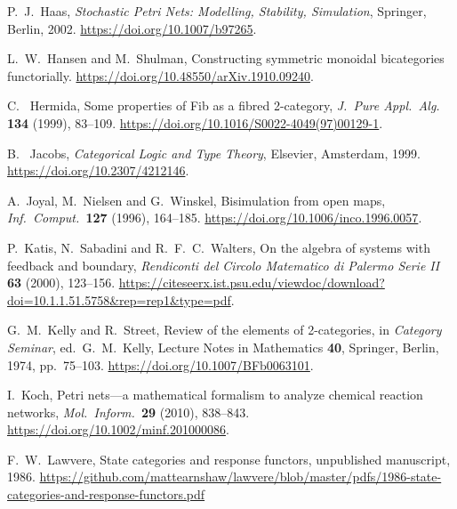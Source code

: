 \documentclass[a4paper,onecolumn, superscriptaddress,10pt, accepted=2022-03-25, issue=SS, volume=VV, shorttitle=papers/compositionality-VV-SS]{compositionalityarticle}
\begin{document}
\begin{thebibliography}{100}
 P.\ J.\ Haas, \textsl{Stochastic Petri Nets: Modelling, Stability, Simulation},
Springer, Berlin, 2002. \href{https://doi.org/10.1007/b97265}{https://doi.org/10.1007/b97265}.

  L.\ W.\ Hansen and M.\ Shulman, Constructing symmetric monoidal bicategories 
functorially. \href{https://doi.org/10.48550/arXiv.1910.09240}{https://doi.org/10.48550/arXiv.1910.09240}.

 C. \ Hermida, Some properties of Fib as a fibred 2-category, \textsl{J.\ Pure Appl.\ Alg.\ } \textbf{134} (1999), 83--109. 
\href{https://doi.org/10.1016/S0022-4049(97)00129-1}{https://doi.org/10.1016/S0022-4049(97)00129-1}.

 B. \ Jacobs, \textsl{Categorical Logic and Type Theory}, Elsevier, Amsterdam, 1999. 
\href{https://doi.org/10.2307/421214}{https://doi.org/10.2307/4212146}.

 A.\ Joyal, M.\ Nielsen and G.\ Winskel, Bisimulation from open maps, \textsl{Inf.\ Comput.\ }\textbf{127} (1996), 164--185. 
\href{https://doi.org/10.1006/inco.1996.0057}{https://doi.org/10.1006/inco.1996.0057}.

 P.\ Katis, N.\ Sabadini and R.\ F.\ C.\ Walters, On the algebra of systems with feedback and boundary, \textsl{Rendiconti del Circolo 
Matematico di Palermo Serie II} \textbf{63} (2000), 123--156. 
\href{https://citeseerx.ist.psu.edu/viewdoc/download?doi=10.1.1.51.5758&rep=rep1&type=pdf}{ 
https://citeseerx.ist.psu.edu/viewdoc/download?doi=10.1.1.51.5758\&rep=rep1\&type=pdf}.

 G.\ M.\ Kelly and R.\ Street, Review of the elements of 2-categories, in \textsl{Category Seminar}, ed.\ G.\ M.\ Kelly, Lecture Notes in 
Mathematics \textbf{40}, Springer, Berlin, 1974, pp.\ 75--103. \href{https://doi.org/10.1007/BFb0063101}{https://doi.org/10.1007/BFb0063101}.

 I.\ Koch, Petri nets---a mathematical formalism to analyze chemical reaction
networks, \textsl{Mol.\ Inform.\  }\textbf{29} (2010), 838--843. 
\href{https://doi.org/10.1002/minf.201000086}{https://doi.org/10.1002/minf.201000086}.

 F.\ W.\ Lawvere, State categories and response functors, unpublished manuscript, 1986. 
\href{https://github.com/mattearnshaw/lawvere/blob/master/pdfs/1986-state-categories-and-response-functors.pdf}{
https://github.com/mattearnshaw/lawvere/blob/master/pdfs/1986-state-categories-and-response-functors.pdf}


\end{thebibliography}
\end{document}
